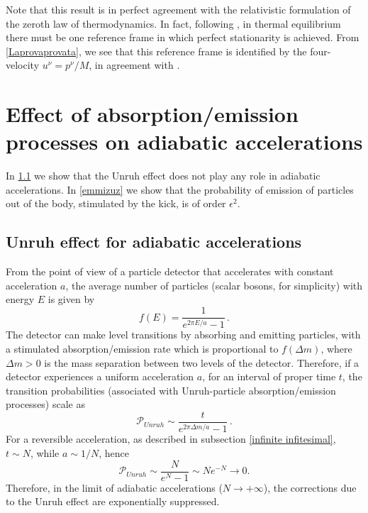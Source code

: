 \documentclass[twocolumn,usenatbib]{mnras2}
\begin{document}
Note that this result is in perfect agreement with the relativistic formulation of the zeroth law of thermodynamics. In fact, following \cite{GavassinoTermometri}, in thermal equilibrium there must be one reference frame in which perfect stationarity is achieved. From \eqref{Laprovaprovata}, we see that this reference frame is identified by the four-velocity $u^\nu=p^\nu/M$, in agreement with \cite{GavassinoTermometri}.

\section{Effect of absorption/emission processes on adiabatic accelerations}

In \ref{UnruhLui} we show that the Unruh effect does not play any role in adiabatic accelerations. In \ref{emmizuz} we show that the probability of emission of particles out of the body, stimulated by the kick, is of order $\epsilon^2$.

\subsection{Unruh effect for adiabatic accelerations}\label{UnruhLui}

From the point of view of a particle detector that accelerates with constant acceleration $a$, the average number of particles (scalar bosons, for simplicity) with energy $E$ is given by \citep{UnruhWald1984,LinHu2006}
\begin{equation}
    f(E) = \dfrac{1}{e^{2\pi E/a}-1} \, .
\end{equation}
The detector can make level transitions by absorbing and emitting particles, with a stimulated absorption/emission rate which is proportional to $f(\Delta m)$, where $\Delta m >0$ is the mass separation between two levels of the detector. Therefore, if a detector experiences a uniform acceleration $a$, for an interval of proper time $t$, the transition probabilities (associated with Unruh-particle absorption/emission processes) scale as \citep{LinHu2007}
\begin{equation}
    \mathcal{P}_{Unruh} \sim \dfrac{t}{e^{2\pi \Delta m/a}-1} \, .
\end{equation}
For a reversible acceleration, as described in subsection \eqref{infinite infitesimal}, $t \sim N$, while $a \sim 1/N$, hence
\begin{equation}
    \mathcal{P}_{Unruh} \sim \dfrac{N}{e^{N}-1} \sim N e^{-N} \longrightarrow 0 .
\end{equation}
Therefore, in the limit of adiabatic accelerations ($N \rightarrow +\infty$), the corrections due to the Unruh effect are exponentially suppressed.
\end{document}
